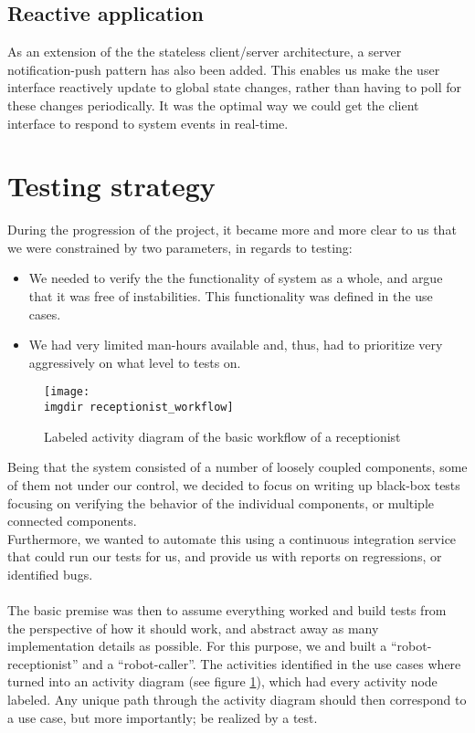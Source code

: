 \subsection{Reactive application}
\label{ssec:server_notifications}
As an extension of the the stateless client/server architecture, a server notification-push pattern has also been added. This enables us make the user interface reactively update to global state changes, rather than having to poll for these changes periodically. It was the optimal way we could get the client interface to respond to system events in real-time.

\section{Testing strategy}
\label{sec:test}
During the progression of the project, it became more and more clear to us that we were constrained by two parameters, in regards to testing:
\begin{itemize}
  \item We needed to verify the the functionality of system as a whole, and argue that it was free of instabilities. This functionality was defined in the use cases.
  \item We had very limited man-hours available and, thus, had to prioritize very aggressively on what level to tests on.
\end{itemize}
\begin{figure}[ht]
\centering
\texttt{[image: \\imgdir receptionist\_workflow]}
\caption{Labeled activity diagram of the basic workflow of a receptionist}
\label{fig:receptionist_workflow}
\end{figure}
Being that the system consisted of a number of loosely coupled components, some of them not under our control, we decided to focus on writing up black-box tests focusing on verifying the behavior of the individual components, or multiple connected components.\\
Furthermore, we wanted to automate this using a continuous integration service that could run our tests for us, and provide us with reports on regressions, or identified bugs.\\\\
The basic premise was then to assume everything worked and build tests from the perspective of how it should work, and abstract away as many implementation details as possible. For this purpose, we and built a ``robot-receptionist'' and a ``robot-caller''. The activities identified in the use cases where turned into an activity diagram (see figure \ref{fig:receptionist_workflow}), which had every activity node labeled. Any unique path through the activity diagram should then correspond to a use case, but more importantly; be realized by a test.


